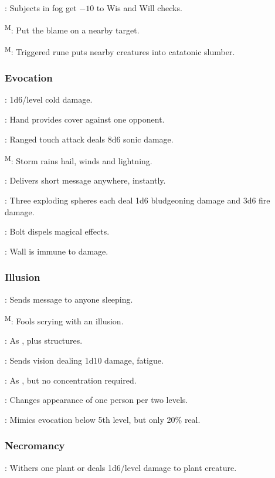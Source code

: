 	: Subjects in fog get $-10$ to Wis and Will checks.

	\textsuperscript{M}: Put the blame on a nearby target. %

	\textsuperscript{M}: Triggered rune puts nearby creatures into catatonic slumber.

\subsubsection{Evocation}
	
	: 1d6/level cold damage.
	
	: Hand provides cover against one opponent.
	
	: Ranged touch attack deals 8d6 sonic damage. %
	
	\textsuperscript{M}: Storm rains hail, winds and lightning. %
	
	: Delivers short message anywhere, instantly.

	: Three exploding spheres each deal 1d6 bludgeoning damage and 3d6 fire damage. %
	
	: Bolt dispels magical effects. %
	
	: Wall is immune to damage.

\subsubsection{Illusion}
	: Sends message to anyone sleeping.

	\textsuperscript{M}: Fools scrying with an illusion.

	: As , plus structures.

	: Sends vision dealing 1d10 damage, fatigue.

	: As , but no concentration required.

	: Changes appearance of one person per two levels.

	: Mimics evocation below 5th level, but only 20\% real.

\subsubsection{Necromancy}
	: Withers one plant or deals 1d6/level damage to plant creature.

